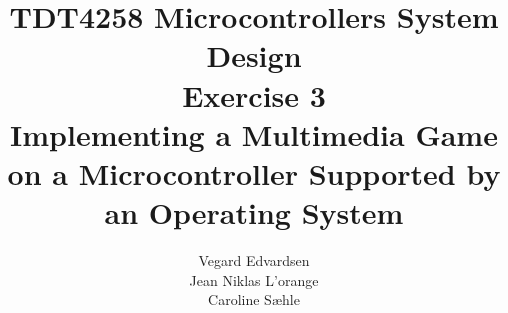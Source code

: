\documentclass[a4paper,10pt]{article}
\title{TDT4258 Microcontrollers System Design\\Exercise 3\\[20pt]
Implementing a Multimedia Game on a Microcontroller Supported by an
Operating System}
\author{Vegard Edvardsen\\Jean Niklas L'orange\\Caroline Sæhle}
\begin{document}
\maketitle

\begin{abstract}

\end{abstract}

\newpage
\tableofcontents
\newpage







\end{document}
